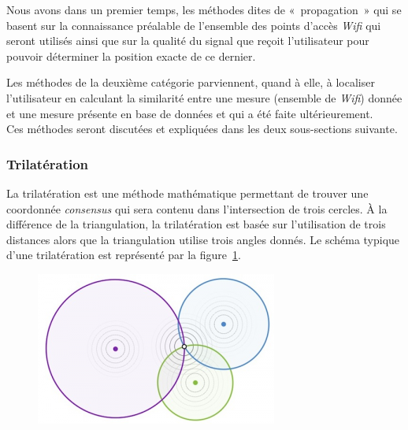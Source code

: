 \documentclass[11pt,journal,compsoc]{IEEEtran}
\begin{document}
    Nous avons dans un premier temps, les méthodes dites de «~propagation~» qui se basent sur la connaissance préalable de l'ensemble des points d'accès
	\textit{Wifi} qui seront utilisés ainsi que sur la qualité du signal que reçoit l'utilisateur pour pouvoir déterminer la position exacte de ce dernier.

    Les méthodes de la deuxième catégorie parviennent, quand à elle, à localiser l'utilisateur en calculant la similarité entre une mesure (ensemble de
	\textit{Wifi}) donnée et une mesure présente en base de données et qui a été faite ultérieurement.\\  %
    Ces méthodes seront discutées et expliquées dans les deux sous-sections suivante.

    \subsubsection{Trilatération}
      La trilatération est une méthode mathématique permettant de trouver une coordonnée \textit{consensus} qui sera contenu dans l'intersection de trois
	  cercles. À la différence de la triangulation, la trilatération est basée sur l'utilisation de trois distances alors que la triangulation utilise
	  trois angles donnés. Le schéma typique d'une trilatération est représenté par la figure~\ref{fig:trilatération}.

	  \begin{figure}
	  	\label{fig:trilatération}
        \includegraphics[scale=0.8]{images/trilateration.png}
      \end{figure}
\end{document}
